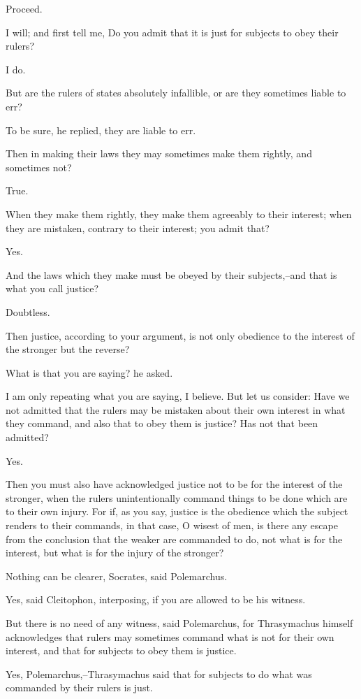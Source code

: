 Proceed.

I will; and first tell me, Do you admit that it is just for subjects to
obey their rulers?

I do.

But are the rulers of states absolutely infallible, or are they
sometimes liable to err?

To be sure, he replied, they are liable to err.

Then in making their laws they may sometimes make them rightly, and
sometimes not?

True.

When they make them rightly, they make them agreeably to their interest;
when they are mistaken, contrary to their interest; you admit that?

Yes.

And the laws which they make must be obeyed by their subjects,--and that
is what you call justice?

Doubtless.

Then justice, according to your argument, is not only obedience to the
interest of the stronger but the reverse?

What is that you are saying? he asked.

I am only repeating what you are saying, I believe. But let us consider:
Have we not admitted that the rulers may be mistaken about their own
interest in what they command, and also that to obey them is justice?
Has not that been admitted?

Yes.

Then you must also have acknowledged justice not to be for the interest
of the stronger, when the rulers unintentionally command things to be
done which are to their own injury. For if, as you say, justice is the
obedience which the subject renders to their commands, in that case, O
wisest of men, is there any escape from the conclusion that the weaker
are commanded to do, not what is for the interest, but what is for the
injury of the stronger?

Nothing can be clearer, Socrates, said Polemarchus.

Yes, said Cleitophon, interposing, if you are allowed to be his witness.

But there is no need of any witness, said Polemarchus, for Thrasymachus
himself acknowledges that rulers may sometimes command what is not for
their own interest, and that for subjects to obey them is justice.

Yes, Polemarchus,--Thrasymachus said that for subjects to do what was
commanded by their rulers is just.

